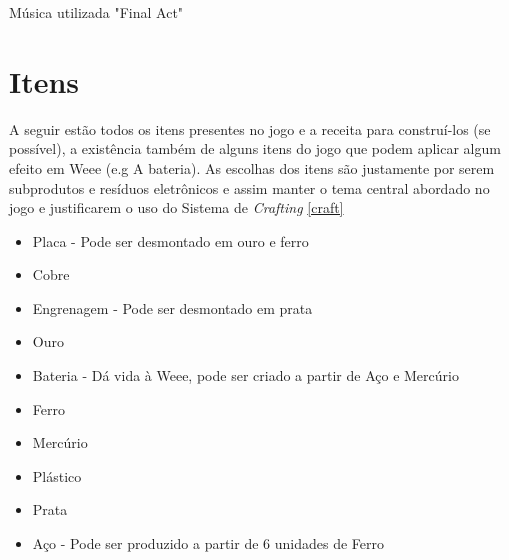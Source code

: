Música utilizada "Final Act" \cite{FinalAct}

\section{Itens}
A seguir estão todos os itens presentes no jogo e a receita para construí-los (se possível), a existência também de alguns itens do jogo que podem aplicar algum efeito em Weee (e.g A bateria). As escolhas dos itens são justamente por serem subprodutos e resíduos eletrônicos e assim manter o tema central abordado no jogo e justificarem o uso do Sistema de \textit{Crafting} \ref{craft}
\label{list:itens}
\begin{itemize}
    \item Placa - Pode ser desmontado em ouro e ferro
    \item Cobre
    \item Engrenagem - Pode ser desmontado em prata
    \item Ouro
    \item Bateria - Dá vida à Weee, pode ser criado a partir de Aço e Mercúrio
    \item Ferro
    \item Mercúrio
    \item Plástico
    \item Prata
    \item Aço - Pode ser produzido a partir de 6 unidades de Ferro
\end{itemize}

\pagebreak
